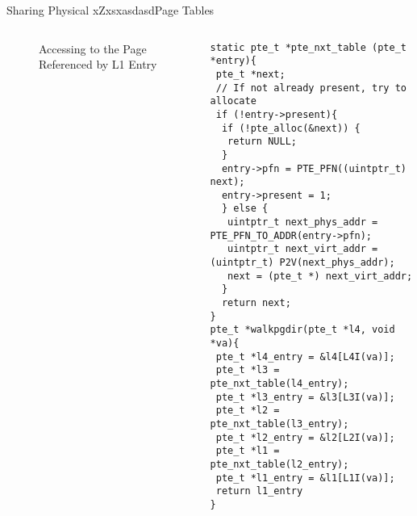 \documentclass[aspectratio=169,xcolor=dvipsnames]{beamer}
\begin{document}
\begin{frame}[fragile]{Sharing Physical xZxsxasdasdPage Tables}
\begin{columns}[c]
\begin{figure}
\begin{tikzpicture}[x=0.75pt,y=0.75pt,yscale=-0.5,xscale=0.5]
\end{tikzpicture}
          \caption{Accessing to the Page Referenced by L1 Entry}
        \label{fig:enter-label}
    \end{figure}
\begin{lstlisting}[style=CStyleNum, basicstyle=\tiny]
static pte_t *pte_nxt_table (pte_t *entry){
 pte_t *next;
 // If not already present, try to allocate
 if (!entry->present){
  if (!pte_alloc(&next)) {
   return NULL;
  }
  entry->pfn = PTE_PFN((uintptr_t) next);
  entry->present = 1;
  } else {
   uintptr_t next_phys_addr = PTE_PFN_TO_ADDR(entry->pfn);        
   uintptr_t next_virt_addr = (uintptr_t) P2V(next_phys_addr);
   next = (pte_t *) next_virt_addr;
  }
  return next;
}   
pte_t *walkpgdir(pte_t *l4, void *va){ 
 pte_t *l4_entry = &l4[L4I(va)];
 pte_t *l3 = pte_nxt_table(l4_entry);
 pte_t *l3_entry = &l3[L3I(va)];
 pte_t *l2 = pte_nxt_table(l3_entry);
 pte_t *l2_entry = &l2[L2I(va)];  
 pte_t *l1 = pte_nxt_table(l2_entry);
 pte_t *l1_entry = &l1[L1I(va)];  
 return l1_entry
}
\end{lstlisting}
\end{columns}
\end{frame}
\end{document}
